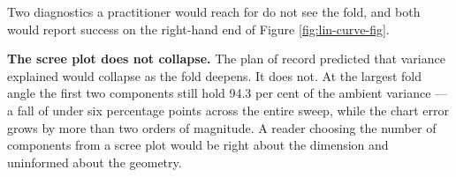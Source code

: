 \documentclass[
  british,
  a4paper,
]{book}
\newenvironment{Shaded}{\begin{snugshade}}{\end{snugshade}}
\newcommand{\AttributeTok}[1]{\textcolor[rgb]{0.13,0.29,0.53}{#1}}
\newcommand{\ControlFlowTok}[1]{\textcolor[rgb]{0.13,0.29,0.53}{\textbf{#1}}}
\newcommand{\DecValTok}[1]{\textcolor[rgb]{0.00,0.00,0.81}{#1}}
\newcommand{\FunctionTok}[1]{\textcolor[rgb]{0.13,0.29,0.53}{\textbf{#1}}}
\newcommand{\NormalTok}[1]{#1}
\newcommand{\OtherTok}[1]{\textcolor[rgb]{0.56,0.35,0.01}{#1}}
\newcommand{\SpecialCharTok}[1]{\textcolor[rgb]{0.81,0.36,0.00}{\textbf{#1}}}
\newcommand{\StringTok}[1]{\textcolor[rgb]{0.31,0.60,0.02}{#1}}
\begin{document}
Two diagnostics a practitioner would reach for do not see the fold, and both
would report success on the right-hand end of Figure \ref{fig:lin-curve-fig}.

\begin{Shaded}
\end{Shaded}

\textbf{The scree plot does not collapse.} The plan of record predicted that variance
explained would collapse as the fold deepens. It does not. At the largest fold
angle the first two components still hold
94.3 per cent of the ambient
variance --- a fall of under six percentage points across the entire sweep, while
the chart error grows by more than two orders of magnitude. A reader choosing the
number of components from a scree plot would be right about the dimension and
uninformed about the geometry.
\end{document}
